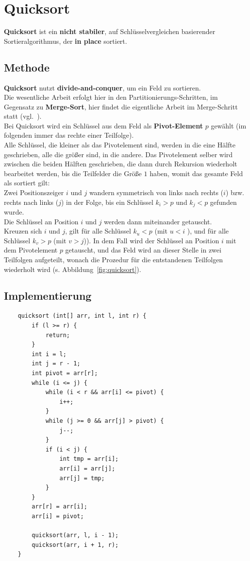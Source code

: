 \section{Quicksort}

\textbf{Quicksort} ist ein \textbf{nicht stabiler}, auf Schlüsselvergleichen basierender Sortieralgorithmus, der \textbf{in place} sortiert.

\subsection{Methode}

\textbf{Quicksort} nutzt \textbf{divide-and-conquer}, um ein Feld zu sortieren.\\
Die wesentliche Arbeit erfolgt hier in den Partitionierungs-Schritten, im Gegensatz zu \textbf{Merge-Sort}, hier findet die eigentliche Arbeit im Merge-Schritt statt (vgl.~\cite[174]{GD18e}).\\

\noindent
Bei Quicksort  wird ein Schlüssel aus dem Feld als \textbf{Pivot-Element} $p$ gewählt (im folgenden immer das rechte einer Teilfolge).\\
Alle Schlüssel, die kleiner als das Pivotelement sind, werden in die eine Hälfte geschrieben, alle die größer sind, in die andere.
Das Pivotelement selber wird zwischen die beiden Hälften geschrieben, die dann durch Rekursion wiederholt bearbeitet werden, bis die Teilfelder die Größe $1$ haben, womit das gesamte Feld als sortiert gilt:\\
Zwei Positionszeiger $i$ und $j$ wandern symmetrisch von links nach rechts ($i$) bzw. rechts nach links ($j$) in der Folge, bis ein Schlüssel $k_i > p$ und $k_j < p$ gefunden wurde. \\
Die Schlüssel an Position $i$ und $j$ werden dann miteinander getauscht.\\
Kreuzen sich $i$ und $j$, gilt für alle Schlüssel $k_u < p$ (mit $u < i$ ), und für alle Schlüssel $k_v > p$ (mit $v > j$)).
In dem Fall wird der Schlüssel an Position $i$ mit dem Pivotelement $p$ getauscht, und das Feld wird an dieser Stelle in zwei Teilfolgen aufgeteilt, wonach die Prozedur für die entstandenen Teilfolgen wiederholt wird (s. Abbildung~\ref{fig:quicksort}).

\subsection{Implementierung}

\begin{verbatim}
    quicksort (int[] arr, int l, int r) {
        if (l >= r) {
            return;
        }
        int i = l;
        int j = r - 1;
        int pivot = arr[r];
        while (i <= j) {
            while (i < r && arr[i] <= pivot) {
                i++;
            }
            while (j >= 0 && arr[j] > pivot) {
                j--;
            }
            if (i < j) {
                int tmp = arr[i];
                arr[i] = arr[j];
                arr[j] = tmp;
            }
        }
        arr[r] = arr[i];
        arr[i] = pivot;

        quicksort(arr, l, i - 1);
        quicksort(arr, i + 1, r);
    }
\end{verbatim}

